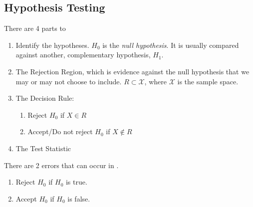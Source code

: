 	\subsection{Hypothesis Testing} \label{subsec:Hypothesis Testing}
	There are 4 parts to 
		\begin{enumerate}
			\item Identify the hypotheses. $H_{0}$ is the \emph{null hypothesis}. It is usually compared against another, complementary hypothesis, $H_{1}$.
			\item The Rejection Region, which is evidence against the null hypothesis that we may or may not choose to include. $R \subset \mathcal{X}$, where $\mathcal{X}$ is the sample space.
			\item The Decision Rule:
				\begin{enumerate}
					\item Reject $H_{0}$ if $X \in R$
					\item Accept/Do not reject $H_{0}$ if $X \notin R$
				\end{enumerate}
			\item The Test Statistic
		\end{enumerate}
	There are 2 errors that can occur in .
		\begin{enumerate}[label=\textbf{Type \Roman* Error: }, ref=Hypothesis Testing Type \Roman* Error, align=left, noitemsep, nolistsep]
			\item Reject $H_{0}$ if $H_{0}$ is true.
			\item Accept $H_{0}$ if $H_{0}$ is false.
		\end{enumerate}